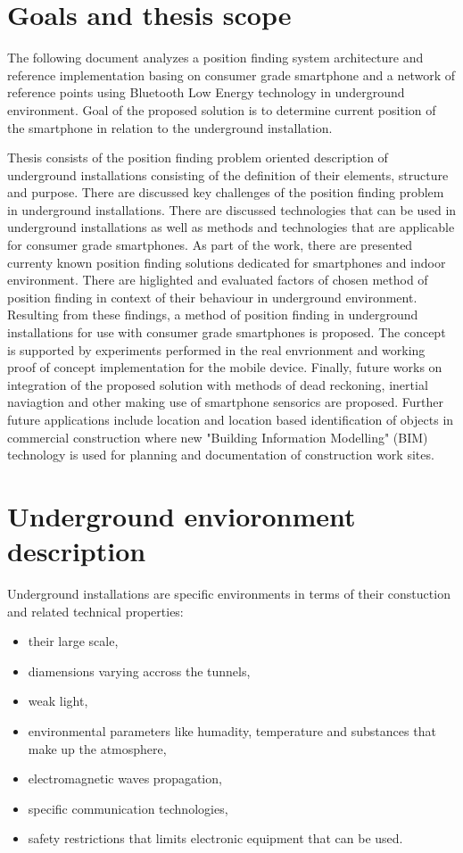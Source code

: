 \documentclass[../main.tex]{subfiles}
\begin{document}
\chapter{Goals and thesis scope}

The following document analyzes a position finding system architecture and reference implementation basing on consumer grade smartphone and a network of reference points using Bluetooth Low Energy technology in underground environment. Goal of the proposed solution is to determine current position of the smartphone in relation to the underground installation.

Thesis consists of the position finding problem oriented description of underground installations consisting of the definition of their elements, structure and purpose. There are discussed key challenges of the position finding problem in underground installations. There are discussed technologies that can be used in underground installations as well as methods and technologies that are applicable for consumer grade smartphones. As part of the work, there are presented currenty known position finding solutions dedicated for smartphones and indoor environment. There are higlighted and evaluated factors of chosen method of position finding in context of their behaviour in underground environment. Resulting from these findings, a method of position finding in underground installations for use with consumer grade smartphones is proposed. The concept is supported by experiments performed in the real envrionment and working proof of concept implementation for the mobile device. Finally, future works on integration of the proposed solution with methods of dead reckoning, inertial naviagtion and other making use of smartphone sensorics are proposed. Further future applications include location and location based identification of objects in commercial construction where new "Building Information Modelling" (BIM) technology is used for planning and documentation of construction work sites.

\chapter{Underground envioronment description}

Underground installations are specific environments in terms of their constuction and related technical properties:
\begin{itemize}
	\item their large scale,
	\item diamensions varying accross the tunnels,
	\item weak light,
	\item environmental parameters like humadity, temperature and substances that make up the atmosphere,
	\item electromagnetic waves propagation,
	\item specific communication technologies,
	\item safety restrictions that limits electronic equipment that can be used.
\end{itemize}
\end{document}
